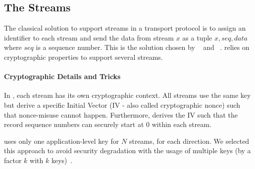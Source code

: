 
\subsection{The \tcpls Streams}\label{sec:datastreams}

The classical solution to support streams in a transport protocol is to assign
an identifier to each stream and send the data from stream $x$ as a tuple
$x,seq,data$ where $seq$ is a sequence number. This is the solution chosen by
\sctp~\cite{rfc4960} and \quic~\cite{draft-ietf-quic-transport}. \tcpls relies
on cryptographic properties to support several streams.

\paragraph*{Cryptographic Details and Tricks} In \tcpls, each stream has its own
cryptographic context. All streams use the same key but derive a specific
Initial Vector (IV - also called cryptographic nonce) such that nonce-misuse
cannot happen. Furthermore, \tcpls derives the IV such that the record sequence
numbers can securely start at $0$ within each stream.

\tcpls uses only one application-level key for $N$ streams, for each direction.
We selected this approach to avoid security degradation with the usage of
multiple keys (by a factor $k$ with $k$ keys)~\cite{chatterjee2011another}.

